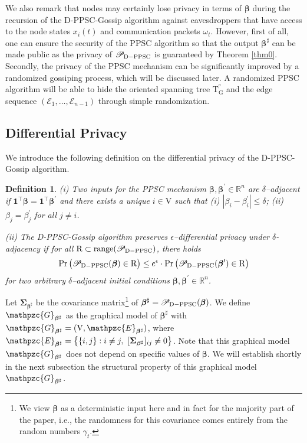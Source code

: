 \documentclass[a4paper, 11pt]{article}
\newcommand{\R}{\mathbb{R}}
\newcommand{\Z}{\mathbb{Z}}
\newcommand{\1}{\mathbf{1}}
\newcommand{\asf}{\mathcal{E}}
\newcommand{\xb}{\mathbf{x}}
\newcommand{\zb}{\mathbf{z}}
\newcommand{\Hb}{\mathbf{H}}
\newcommand{\mG}{\mathrm{G}}
\newcommand{\mV}{\mathrm{V}}
\newcommand{\mT}{\mathrm{T}}
\newcommand{\mTG}{\mT^{^o}_{\mG}}
\newcommand{\mGM}{\mathpzc{G}}
\newcommand{\mEM}{\mathpzc{E}}
\newcommand{\betab}{\bm{\beta}}
\newcommand{\Sigmab}{\bm{\Sigma}}
\newcommand{\mR}{\mathrm{R}}
\newcommand{\dH}{\delta_{\rm H}}
\newcommand{\dz}{\delta_{\rm z}}
\newcommand{\mM}{\mathpzc{M}}
\newcommand{\HH}{\mathbb{H}}
\newcommand{\ZZ}{\mathbb{Z}}
\newtheorem{definition}{Definition}
\begin{document}
We also remark that nodes may certainly  lose privacy in terms of $\betab$ during the recursion of the D-PPSC-Gossip algorithm against eavesdroppers that have access to the node states $x_i(t)$ and communication packets $\omega_t$. However, first of all, one can ensure the security of  the PPSC algorithm so that the output  $\betab^\sharp$ can be made public as the privacy of $\mathscr{P}_{\rm D-PPSC}$ is guaranteed by Theorem \ref{thm0}. Secondly, the privacy of the PPSC mechanism can be significantly improved by a randomized gossiping process, which will be discussed later. A randomized PPSC algorithm will be able to hide   the oriented spanning tree $\mTG$ and  the edge sequence $(\asf_1,\dots,\asf_{n-1 })$ through simple randomization. 


\subsection{Differential Privacy}

We introduce the following definition on the differential privacy of the D-PPSC-Gossip algorithm. 
\begin{definition}
	(i) Two inputs for the PPSC mechanism $\betab,\betab^\prime\in\R^n$ are  $\delta$--adjacent if $\1^\top\betab=\1^\top\betab^\prime$ and there exists a unique $i\in\mV$ such that (i) $\left|\beta_i-\beta^\prime_i\right|\le\delta$; (ii) $\beta_j=\beta^\prime_j$ for all $j\neq i$.
	
	(ii)
	The D-PPSC-Gossip algorithm preserves $\epsilon $--differential privacy under $\delta$-adjacency  if for all $\mR\subset{\rm range}(\mathscr{P}_{\rm D-PPSC})$, there holds
	$$\Pr\big(\mathscr{P}_{\rm D-PPSC}(\betab)\in\mR\big)\le e^\epsilon\cdot\Pr\big(\mathscr{P}_{\rm D-PPSC}(\betab^\prime)\in\mR\big)$$
	for two arbitrary $\delta$--adjacent initial conditions $\betab,\betab^\prime\in\R^n$.
\end{definition}


Let $\Sigmab_{\betab^\sharp}$ be the covariance matrix\footnote{We view $\betab$ as a deterministic input here and in fact for the majority part of the paper, i.e., the randomness for this covariance comes entirely from the random numbers $\gamma_t$. } of $\betab^\sharp=\mathscr{P}_{\rm D-PPSC}(\betab)$. We define $\mGM_{\betab^\sharp}$ as the graphical model of $\betab^\sharp$ with $\mGM_{\betab^\sharp}=(\mV,\mEM_{\betab^\sharp})$, where $\mEM_{\betab^\sharp}=\big\{\{i,j\}:i\neq j,\ [\Sigmab_{\betab^\sharp}]_{ij}\neq 0\big\}$. Note that this graphical model $\mGM_{\betab^\sharp}$ does not depend on specific values of $\betab$. We will establish shortly in the next subsection the structural property of this graphical model $\mGM_{\betab^\sharp}$. 
\end{document}
